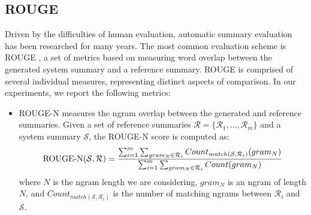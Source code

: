 \subsection{ROUGE}\label{sec:rouge}
Driven by the difficulties of human evaluation, automatic summary evaluation has been researched for many years. The most common evaluation scheme is ROUGE \parencite{eva1_lin:2004:ACLsummarization}, a set of metrics based on measuring word overlap between the generated system summary and a reference summary. ROUGE is comprised of several individual measures, representing distinct aspects of comparison. In our experiments, we report the following metrics:
\begin{itemize}
    \item ROUGE-N measures the ngram overlap between the generated and reference summaries. Given a set of reference summaries $\mathcal{R} = \{\mathcal{R}_1,\dots,\mathcal{R}_m\}$ and a system summary $\mathcal{S}$, the ROUGE-N score is computed as:
    \begin{equation}
        \operatorname{ROUGE-N}(\mathcal{S}, \mathcal{R}) = \frac{\sum_{i=1}^m  \sum_{gram_N \in \mathcal{R}_i} Count_{match(\mathcal{S}, \mathcal{R}_i)}(gram_N)}{\sum_{i=1}^m \sum_{gram_N \in \mathcal{R}_i} Count(gram_N)}
    \end{equation}
    where $N$ is the ngram length we are considering, $gram_N$ is an ngram of length $N$, and $Count_{match(\mathcal{S}, \mathcal{R}_i)}$ is the number of matching ngrams between $\mathcal{R}_i$ and $\mathcal{S}$.
    

\end{itemize}
